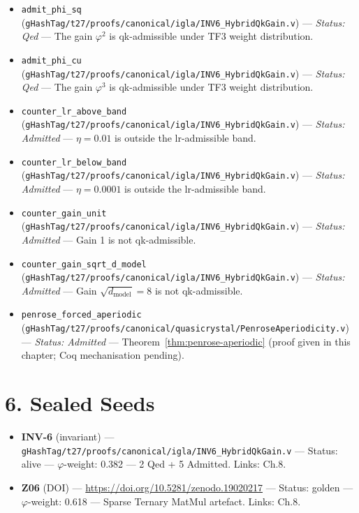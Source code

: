 \begin{itemize}
\tightlist
\item
  \texttt{admit\_phi\_sq}
  (\texttt{gHashTag/t27/proofs/canonical/igla/INV6\_HybridQkGain.v})
  --- \emph{Status: Qed} --- The gain
  \(\varphi^2\) is qk-admissible under TF3 weight
  distribution.
\item
  \texttt{admit\_phi\_cu}
  (\texttt{gHashTag/t27/proofs/canonical/igla/INV6\_HybridQkGain.v})
  --- \emph{Status: Qed} --- The gain
  \(\varphi^3\) is qk-admissible under TF3 weight
  distribution.
\item
  \texttt{counter\_lr\_above\_band}
  (\texttt{gHashTag/t27/proofs/canonical/igla/INV6\_HybridQkGain.v})
  --- \emph{Status: Admitted} --- \(\eta = 0.01\)
  is outside the lr-admissible band.
\item
  \texttt{counter\_lr\_below\_band}
  (\texttt{gHashTag/t27/proofs/canonical/igla/INV6\_HybridQkGain.v})
  --- \emph{Status: Admitted} ---
  \(\eta = 0.0001\) is outside the lr-admissible
  band.
\item
  \texttt{counter\_gain\_unit}
  (\texttt{gHashTag/t27/proofs/canonical/igla/INV6\_HybridQkGain.v})
  --- \emph{Status: Admitted} --- Gain 1 is not
  qk-admissible.
\item
  \texttt{counter\_gain\_sqrt\_d\_model}
  (\texttt{gHashTag/t27/proofs/canonical/igla/INV6\_HybridQkGain.v})
  --- \emph{Status: Admitted} --- Gain
  \(\sqrt{d_\text{model}}=8\) is not
  qk-admissible.
\item
  \texttt{penrose\_forced\_aperiodic}
  (\texttt{gHashTag/t27/proofs/canonical/quasicrystal/PenroseAperiodicity.v})
  --- \emph{Status: Admitted} ---
  Theorem~\ref{thm:penrose-aperiodic} (proof given
  in this chapter; Coq mechanisation pending).
\end{itemize}

\section{6. Sealed Seeds}\label{sealed-seeds}

\begin{itemize}
\tightlist
\item
  \textbf{INV-6} (invariant) ---
  \texttt{gHashTag/t27/proofs/canonical/igla/INV6\_HybridQkGain.v}
  --- Status: alive --- \(\varphi\)-weight: 0.382 --- 2 Qed
  + 5 Admitted. Links: Ch.8.
\item
  \textbf{Z06} (DOI) ---
  \url{https://doi.org/10.5281/zenodo.19020217} ---
  Status: golden --- \(\varphi\)-weight: 0.618 --- Sparse
  Ternary MatMul artefact. Links: Ch.8.
\end{itemize}

